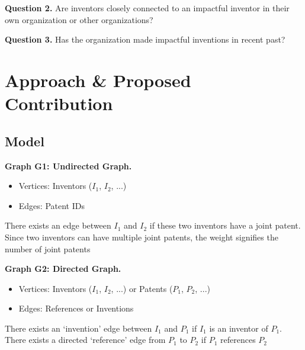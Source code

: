 \documentclass[11pt]{article}
\renewcommand{\paragraph}{\vspace{3pt}\noindent\textbf}
\begin{document}
\paragraph{Question  2.} Are inventors closely connected to an impactful inventor in their own organization or other organizations? %

\paragraph{Question  3.} Has the organization made impactful inventions in recent past? %

\section{Approach \& Proposed Contribution}

\subsection{Model}

\paragraph{Graph G1: Undirected Graph.}
\begin{itemize}
\item {Vertices:} Inventors  ($I_1$, $I_2$, ...)
\item {Edges:} Patent IDs
\end{itemize}

There exists an edge between $I_1$ and $I_2$ if these two inventors have a joint patent.
Since two inventors can have multiple joint patents, the weight signifies the number of joint patents 

\paragraph{Graph G2: Directed Graph.}
\begin{itemize}
\item {Vertices:} Inventors ($I_1$, $I_2$, ...) or Patents ($P_1$, $P_2$, ...)
\item {Edges:} References or Inventions
\end{itemize}

There exists an `invention’ edge between $I_1$ and $P_1$ if $I_1$ is an inventor of $P_1$.
There exists a directed `reference’ edge from $P_1$ to $P_2$ if $P_1$ references $P_2$
\end{document}
